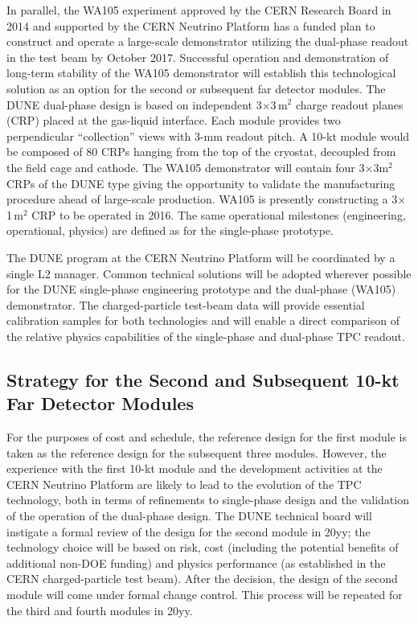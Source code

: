 In parallel, the WA105 experiment approved by the CERN Research Board in 2014 and supported 
by the CERN Neutrino Platform has a funded plan to construct and operate a large-scale 
demonstrator utilizing the dual-phase readout in the test beam by October 2017. 
Successful operation and demonstration of long-term stability of the WA105 demonstrator 
will establish this technological solution as an option for the second or subsequent 
far detector modules. The DUNE dual-phase design is based on independent 3$\times$3\,m$^2$
charge readout planes (CRP) placed at the gas-liquid interface. Each module provides 
two perpendicular ``collection'' views with 3-mm readout pitch. A 10-kt module 
would be composed of 80 CRPs hanging from the top of the cryostat, decoupled from 
the field cage and cathode. The WA105 demonstrator will contain four 3$\times$3m$^2$ 
CRPs of the DUNE type giving the opportunity to validate the manufacturing procedure 
ahead of large-scale production. WA105 is presently constructing a 3$\times$1\,m$^2$ 
CRP to be operated in 2016. The same operational milestones (engineering, operational, 
physics) are defined as for the single-phase prototype.

The DUNE program at the CERN Neutrino Platform will be coordinated by a single 
L2 manager. Common technical solutions will be adopted wherever possible for the 
DUNE single-phase engineering prototype and the dual-phase (WA105) demonstrator. 
The charged-particle test-beam data will provide essential calibration samples 
for both technologies and will enable a direct comparison of the relative physics 
capabilities of the single-phase and dual-phase TPC readout. 

\subsection{Strategy for the Second and Subsequent 10-kt Far Detector Modules}
\label{v1ch3:subsqt-fd-mod-strategy}

For the purposes of cost and schedule, the reference design for the first module 
is taken as the reference design for the subsequent three modules. However, 
the experience with the first 10-kt module and the development activities at 
the CERN Neutrino Platform are likely to lead to the evolution of the TPC technology, both 
in terms of refinements to single-phase design and the validation of the operation 
of the dual-phase design. The DUNE technical board will instigate a formal review 
of the design for the second module in 20yy; %
the technology choice 
will be based on risk, cost (including the potential benefits of additional 
non-DOE funding) and physics performance (as established in the CERN charged-particle 
test beam). After the decision, the design of the second module will come under formal 
change control. This process will be repeated for the third and fourth modules 
in 20yy.%

